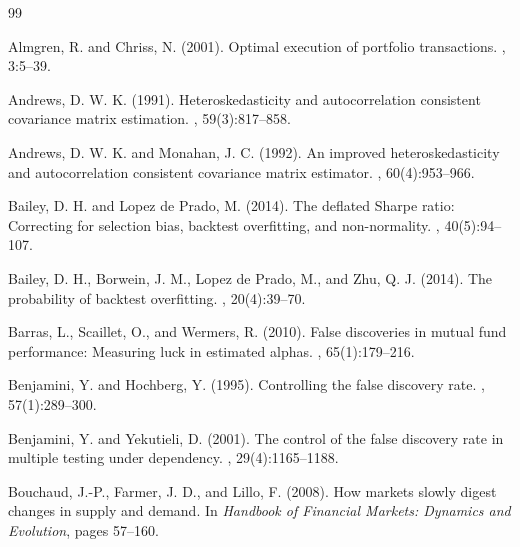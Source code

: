 \documentclass[12pt,a4paper]{article}
\begin{document}

\begin{thebibliography}{99}

Almgren, R. and Chriss, N. (2001).
\newblock Optimal execution of portfolio transactions.
, 3:5--39.

Andrews, D. W. K. (1991).
\newblock Heteroskedasticity and autocorrelation consistent covariance matrix estimation.
, 59(3):817--858.

Andrews, D. W. K. and Monahan, J. C. (1992).
\newblock An improved heteroskedasticity and autocorrelation consistent covariance matrix estimator.
, 60(4):953--966.

Bailey, D. H. and Lopez de Prado, M. (2014).
\newblock The deflated Sharpe ratio: Correcting for selection bias, backtest overfitting, and non-normality.
, 40(5):94--107.

Bailey, D. H., Borwein, J. M., Lopez de Prado, M., and Zhu, Q. J. (2014).
\newblock The probability of backtest overfitting.
, 20(4):39--70.

Barras, L., Scaillet, O., and Wermers, R. (2010).
\newblock False discoveries in mutual fund performance: Measuring luck in estimated alphas.
, 65(1):179--216.

Benjamini, Y. and Hochberg, Y. (1995).
\newblock Controlling the false discovery rate.
, 57(1):289--300.

Benjamini, Y. and Yekutieli, D. (2001).
\newblock The control of the false discovery rate in multiple testing under dependency.
, 29(4):1165--1188.

Bouchaud, J.-P., Farmer, J. D., and Lillo, F. (2008).
\newblock How markets slowly digest changes in supply and demand.
\newblock In {\em Handbook of Financial Markets: Dynamics and Evolution}, pages 57--160.


\end{thebibliography}
\end{document}
